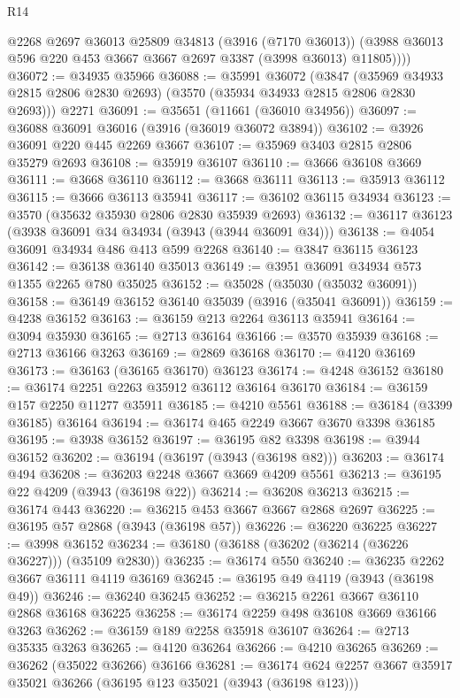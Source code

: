 \begin{lexlean}{R14}
\begin{coremodule}
          @2268
          @2697
          @36013
          @25809
          @34813
          (@3916 (@7170 @36013))
          (@3988 @36013 @596 @220 @453 @3667 @3667 @2697 @3387 (@3998 @36013) @11805))))
@36072 := @34935 @35966
@36088 := @35991
    @36072
    (@3847 (@35969 @34933 @2815 @2806 @2830 @2693) (@3570 (@35934 @34933 @2815 @2806 @2830 @2693)))
    @2271
@36091 := @35651 (@11661 (@36010 @34956))
@36097 := @36088 @36091 @36016 (@3916 (@36019 @36072 @3894))
@36102 := @3926 @36091 @220 @445 @2269 @3667
@36107 := @35969 @3403 @2815 @2806 @35279 @2693
@36108 := @35919 @36107
@36110 := @3666 @36108 @3669
@36111 := @3668 @36110
@36112 := @3668 @36111
@36113 := @35913 @36112
@36115 := @3666 @36113 @35941
@36117 := @36102 @36115 @34934
@36123 := @3570 (@35632 @35930 @2806 @2830 @35939 @2693)
@36132 := @36117 @36123 (@3938 @36091 @34 @34934 (@3943 (@3944 @36091 @34)))
@36138 := @4054 @36091 @34934 @486 @413 @599 @2268
@36140 := @3847 @36115 @36123
@36142 := @36138 @36140 @35013
@36149 := @3951 @36091 @34934 @573 @1355 @2265 @780 @35025
@36152 := @35028 (@35030 (@35032 @36091))
@36158 := @36149 @36152 @36140 @35039 (@3916 (@35041 @36091))
@36159 := @4238 @36152
@36163 := @36159 @213 @2264 @36113 @35941
@36164 := @3094 @35930
@36165 := @2713 @36164
@36166 := @3570 @35939
@36168 := @2713 @36166 @3263
@36169 := @2869 @36168
@36170 := @4120 @36169
@36173 := @36163 (@36165 @36170) @36123
@36174 := @4248 @36152
@36180 := @36174 @2251 @2263 @35912 @36112 @36164 @36170
@36184 := @36159 @157 @2250 @11277 @35911
@36185 := @4210 @5561
@36188 := @36184 (@3399 @36185) @36164
@36194 := @36174 @465 @2249 @3667 @3670 @3398 @36185
@36195 := @3938 @36152
@36197 := @36195 @82 @3398
@36198 := @3944 @36152
@36202 := @36194 (@36197 (@3943 (@36198 @82)))
@36203 := @36174 @494
@36208 := @36203 @2248 @3667 @3669 @4209 @5561
@36213 := @36195 @22 @4209 (@3943 (@36198 @22))
@36214 := @36208 @36213
@36215 := @36174 @443
@36220 := @36215 @453 @3667 @3667 @2868 @2697
@36225 := @36195 @57 @2868 (@3943 (@36198 @57))
@36226 := @36220 @36225
@36227 := @3998 @36152
@36234 := @36180 (@36188 (@36202 (@36214 (@36226 @36227))) (@35109 @2830))
@36235 := @36174 @550
@36240 := @36235 @2262 @3667 @36111 @4119 @36169
@36245 := @36195 @49 @4119 (@3943 (@36198 @49))
@36246 := @36240 @36245
@36252 := @36215 @2261 @3667 @36110 @2868 @36168 @36225
@36258 := @36174 @2259 @498 @36108 @3669 @36166 @3263
@36262 := @36159 @189 @2258 @35918 @36107
@36264 := @2713 @35335 @3263
@36265 := @4120 @36264
@36266 := @4210 @36265
@36269 := @36262 (@35022 @36266) @36166
@36281 := @36174 @624 @2257 @3667 @35917 @35021 @36266 (@36195 @123 @35021 (@3943 (@36198 @123)))

\end{coremodule}
\end{lexlean}

